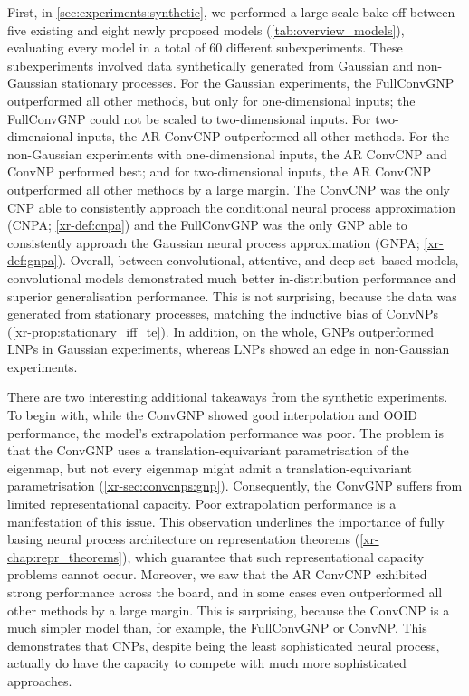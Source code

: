 \documentclass[12pt, twoside]{report}
\newcommand{\xrprefix}[1]{xr-#1}
\begin{document}
First, in \cref{sec:experiments:synthetic}, we performed a large-scale bake-off between five existing and eight newly proposed models (\cref{tab:overview_models}), evaluating every model in a total of 60 different subexperiments.
These subexperiments involved data synthetically generated from Gaussian and non-Gaussian stationary processes. 
For the Gaussian experiments, the FullConvGNP outperformed all other methods, but only for one-dimensional inputs;
the FullConvGNP could not be scaled to two-dimensional inputs.
For two-dimensional inputs, the AR ConvCNP outperformed all other methods.
For the non-Gaussian experiments with one-dimensional inputs, the AR ConvCNP and ConvNP performed best;
and for two-dimensional inputs, the AR ConvCNP outperformed all other methods by a large margin.
The ConvCNP was the only CNP able to consistently approach the conditional neural process approximation (CNPA; \cref{\xrprefix{def:cnpa}})
and the FullConvGNP was the only GNP able to consistently approach the Gaussian neural process approximation (GNPA; \cref{\xrprefix{def:gnpa}}).
Overall, between convolutional, attentive, and deep set--based models, convolutional models demonstrated much better in-distribution performance and superior generalisation performance.
This is not surprising, because the data was generated from stationary processes, matching the inductive bias of ConvNPs (\cref{\xrprefix{prop:stationary_iff_te}}).
In addition, on the whole, GNPs outperformed LNPs in Gaussian experiments, whereas LNPs showed an edge in non-Gaussian experiments.

There are two interesting additional takeaways from the synthetic experiments.
To begin with, while the ConvGNP showed good interpolation and OOID performance, the model's extrapolation performance was poor.
The problem is that the ConvGNP uses a translation-equivariant parametrisation of the eigenmap, but not every eigenmap might admit a translation-equivariant parametrisation (\cref{\xrprefix{sec:convcnps:gnp}}).
Consequently, the ConvGNP suffers from limited representational capacity.
Poor extrapolation performance is a manifestation of this issue.
This observation underlines the importance of fully basing neural process architecture on representation theorems (\cref{\xrprefix{chap:repr_theorems}}), which guarantee that such representational capacity problems cannot occur.
Moreover, we saw that the AR ConvCNP exhibited strong performance across the board, and in some cases even outperformed all other methods by a large margin.
This is surprising, because the ConvCNP is a much simpler model than, for example, the FullConvGNP or ConvNP.
This demonstrates that CNPs, despite being the least sophisticated neural process, actually do have the capacity to compete with much more sophisticated approaches.
\end{document}
